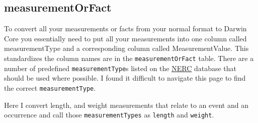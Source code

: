 \documentclass[
]{book}
\begin{document}
\hypertarget{measurementorfact}{%
\subsection{measurementOrFact}\label{measurementorfact}}

To convert all your measurements or facts from your normal format to Darwin Core you essentially need to put all your measurements into one column called measurementType and a corresponding column called MeasurementValue. This standardizes the column names are in the \texttt{measurementOrFact} table. There are a number of predefined \texttt{measurementType}s listed on the \href{https://www.bodc.ac.uk/resources/vocabularies/}{NERC} database that should be used where possible. I found it difficult to navigate this page to find the correct \texttt{measurementType}.

Here I convert length, and weight measurements that relate to an event and an occurrence and call those \texttt{measurementTypes} as \texttt{length} and \texttt{weight}.
\end{document}
